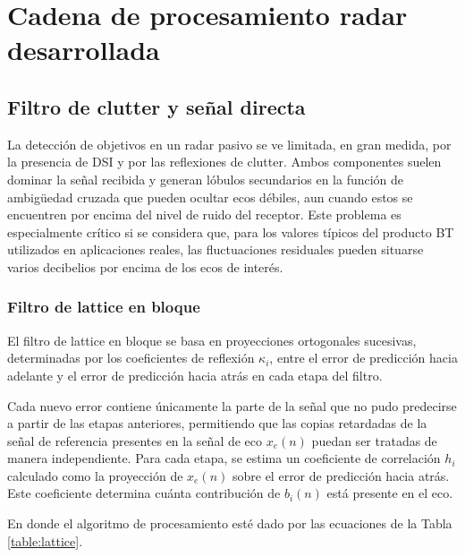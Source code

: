 \chapter{Cadena de procesamiento radar desarrollada}

\section{Filtro de clutter y señal directa}

La detección de objetivos en un radar pasivo se ve limitada, en gran medida, por la presencia de DSI y por las reflexiones de clutter. Ambos componentes suelen dominar la señal recibida y generan lóbulos secundarios en la función de ambigüedad cruzada que pueden ocultar ecos débiles, aun cuando estos se encuentren por encima del nivel de ruido del receptor. Este problema es especialmente crítico si se considera que, para los valores típicos del producto BT utilizados en aplicaciones reales, las fluctuaciones residuales pueden situarse varios decibelios por encima de los ecos de interés.

\subsection{Filtro de lattice en bloque}

El filtro de lattice en bloque se basa en proyecciones ortogonales sucesivas, determinadas por los coeficientes de reflexión $\kappa_i$, entre el error de predicción hacia adelante y el error de predicción hacia atrás en cada etapa del filtro.

Cada nuevo error contiene únicamente la parte de la señal que no pudo predecirse a partir de las etapas anteriores, permitiendo que las copias retardadas de la señal de referencia presentes en la señal de eco $x_e(n)$ puedan ser tratadas de manera independiente. Para cada etapa, se estima un coeficiente de correlación $h_i$ calculado como la proyección de $x_e(n)$ sobre el error de predicción hacia atrás. Este coeficiente determina cuánta contribución de $b_i(n)$ está presente en el eco.


En donde el algoritmo de procesamiento esté dado por las ecuaciones de la Tabla \ref{table:lattice}.


